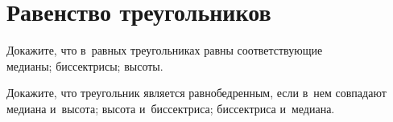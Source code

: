 
\section*{Равенство треугольников}



\setcounter{jeolmsubproblem}{0}%
Докажите, что в~равных треугольниках равны соответствующие
\\
\subproblem медианы;
\quad
\subproblem биссектрисы;
\quad
\subproblem высоты.

\setcounter{jeolmsubproblem}{0}%
Докажите, что треугольник является равнобедренным, если в~нем совпадают
\\
\subproblem медиана и~высота;
\quad
\subproblem высота и~биссектриса;
\quad
\subproblem биссектриса и~медиана.

